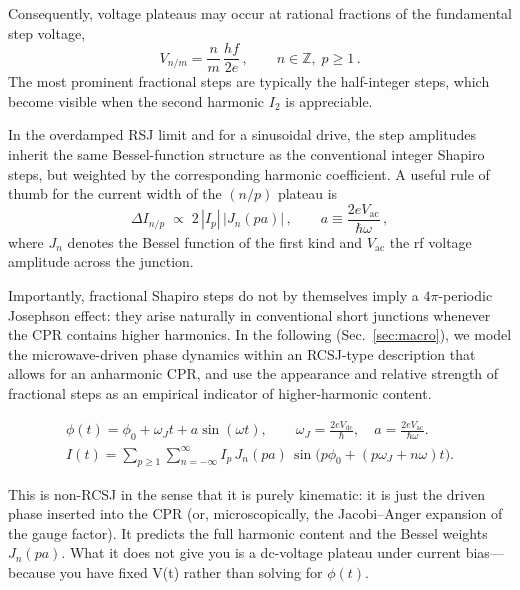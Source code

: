             Consequently, voltage plateaus may occur at rational fractions of the fundamental step voltage,
            \begin{equation}
                V_{n/m}=\frac{n}{m}\,\frac{hf}{2e}\,,\qquad n\in\mathbb{Z},\; p\ge 1\,.
                \label{eq:meso:shapiro-fractional}
            \end{equation}
            The most prominent fractional steps are typically the half-integer steps, which become visible when the second harmonic $I_2$ is appreciable.

            In the overdamped RSJ limit and for a sinusoidal drive, the step amplitudes inherit the same Bessel-function structure as the conventional integer Shapiro steps, but weighted by the corresponding harmonic coefficient. A useful rule of thumb for the current width of the $(n/p)$ plateau is
            \begin{equation}
                \Delta I_{n/p}\;\propto\;2\,|I_p|\,\big|J_n(p a)\big|\,,\qquad a\equiv\frac{2eV_\mathrm{ac}}{\hbar\omega}\,,
                \label{eq:meso:shapiro-bessel}
            \end{equation}
            where $J_n$ denotes the Bessel function of the first kind and $V_\mathrm{ac}$ the rf voltage amplitude across the junction.

            Importantly, fractional Shapiro steps do not by themselves imply a $4\pi$-periodic Josephson effect: they arise naturally in conventional short junctions whenever the CPR contains higher harmonics. In the following (Sec.~\ref{sec:macro}), we model the microwave-driven phase dynamics within an RCSJ-type description that allows for an anharmonic CPR, and use the appearance and relative strength of fractional steps as an empirical indicator of higher-harmonic content.
            
            \begin{align}                
                \phi(t)=\phi_0+\omega_J t + a\sin(\omega t),\qquad
                \omega_J=\frac{2eV_\mathrm{dc}}{\hbar},\quad a=\frac{2eV_\mathrm{ac}}{\hbar\omega}.\\
                I(t)=\sum_{p\ge 1}\sum_{n=-\infty}^{\infty} I_p\,J_n(pa)\,
                \sin\!\Big(p\phi_0+(p\omega_J+n\omega)t\Big).
            \end{align}

            This is non-RCSJ in the sense that it is purely kinematic: it is just the driven phase inserted into the CPR (or, microscopically, the Jacobi--Anger expansion of the gauge factor). It predicts the full harmonic content and the Bessel weights $J_n(pa)$. What it does not give you is a dc-voltage plateau under current bias—because you have fixed V(t) rather than solving for $\phi(t)$.


